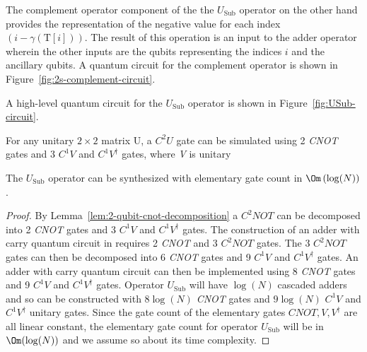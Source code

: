 The complement operator component of the the $U_{\mathrm{Sub}}$ operator on the other hand provides the representation of the negative value for each index $(i-\gamma(\mathrm{T}[i]))$. The result of this operation is an input to the adder operator wherein the other inputs are the qubits representing the indices $i$ and the ancillary qubits. A quantum circuit for the complement operator is shown in Figure~\ref{fig:2s-complement-circuit}.

A high-level quantum circuit for the $U_{\mathrm{Sub}}$ operator is shown in Figure~\ref{fig:USub-circuit}.

\begin{lemma}\label{lem:2-qubit-cnot-decomposition}
For any unitary $2 \times 2$ matrix U, a $C^2U$ gate can be simulated using 2 \textit{CNOT} gates and 3 $C^1V$ and $C^1 V^\dagger$ gates, where \textit{V} is unitary
\end{lemma}

\begin{lemma}\label{lem:U-sub-time-complexity}
The $U_{\mathrm{Sub}}$ operator can be synthesized with elementary gate count in $\Om\left(\log(N) \right)$.
\end{lemma}
\begin{proof}
By Lemma~\ref{lem:2-qubit-cnot-decomposition} a $C^2NOT$ can be decomposed into 2 \textit{CNOT} gates and 3 $C^1V$ and $C^1 V^\dagger$ gates. The construction of an adder with carry quantum circuit in \cite{Barenco1996} requires 2 \textit{CNOT} and 3 $C^2NOT$ gates. The 3 $C^2NOT$ gates can then be decomposed into 6 \textit{CNOT} gates and 9 $C^1V$ and $C^1 V^\dagger$ gates. An adder with carry quantum circuit can then be implemented using 8 \textit{CNOT} gates and 9 $C^1V$ and $C^1 V^\dagger$ gates. Operator $U_{\mathrm{Sub}}$ will have $\log(N)$ cascaded adders and so can be constructed with $8\log(N)$ \textit{CNOT} gates and $9\log(N)$ $C^1V$ and $C^1 V^\dagger$ unitary gates. Since the gate count of the elementary gates $CNOT, V, V^\dagger$ are all linear constant, the elementary gate count for operator $U_{\mathrm{Sub}}$ will be in $\Om(\log(N))$ and we assume so about its time complexity.
\end{proof}


